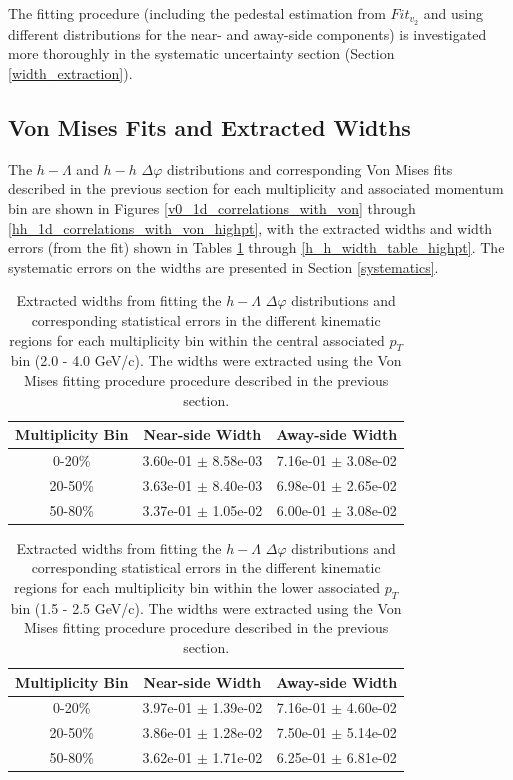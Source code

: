 \documentclass[ALICE,manyauthors]{ALICE_analysis_notes}
\begin{document}
The fitting procedure (including the pedestal estimation from $Fit_{v_{2}}$ and using different distributions for the near- and away-side components) is investigated more thoroughly in the systematic uncertainty section (Section \ref{width_extraction}).

\subsection{Von Mises Fits and Extracted Widths}
\label{von_mises_widths}
The $h-\Lambda$ and $h-h$ $\Delta\varphi$ distributions and corresponding Von Mises fits described in the previous section for each multiplicity and associated momentum bin are shown in Figures \ref{v0_1d_correlations_with_von} through \ref{hh_1d_correlations_with_von_highpt}, with the extracted widths and width errors (from the fit) shown in Tables \ref{h_lambda_width_table} through \ref{h_h_width_table_highpt}. The systematic errors on the widths are presented in Section \ref{systematics}.

\begin{table}[h!]
\centering
\begin{tabular}{| c || c | c | }
\hline
Multiplicity Bin & Near-side Width & Away-side Width \\
\hline
0-20\% & 3.60e-01 $\pm$ 8.58e-03 &  7.16e-01 $\pm$ 3.08e-02 \\
20-50\% & 3.63e-01 $\pm$ 8.40e-03 &  6.98e-01 $\pm$ 2.65e-02 \\
50-80\% & 3.37e-01 $\pm$ 1.05e-02 &  6.00e-01 $\pm$ 3.08e-02 \\
\hline
\end{tabular}
\caption{Extracted widths from fitting the $h-\Lambda$ $\Delta\varphi$ distributions and corresponding statistical errors in the different kinematic regions for each multiplicity bin within the central associated $p_{T}$ bin (2.0 - 4.0 GeV/c). The widths were extracted using the Von Mises fitting procedure procedure described in the previous section.}
\label{h_lambda_width_table}
\end{table}

\begin{table}[h!]
\centering
\begin{tabular}{| c || c | c | }
\hline
Multiplicity Bin & Near-side Width & Away-side Width \\
\hline
0-20\% & 3.97e-01 $\pm$ 1.39e-02 &  7.16e-01 $\pm$ 4.60e-02 \\
20-50\% & 3.86e-01 $\pm$ 1.28e-02 &  7.50e-01 $\pm$ 5.14e-02 \\
50-80\% & 3.62e-01 $\pm$ 1.71e-02 &  6.25e-01 $\pm$ 6.81e-02 \\
\hline
\end{tabular}
\caption{Extracted widths from fitting the $h-\Lambda$ $\Delta\varphi$ distributions and corresponding statistical errors in the different kinematic regions for each multiplicity bin within the lower associated $p_{T}$ bin (1.5 - 2.5 GeV/c). The widths were extracted using the Von Mises fitting procedure procedure described in the previous section.}
\label{h_lambda_width_table_lowpt}
\end{table}
\end{document}
